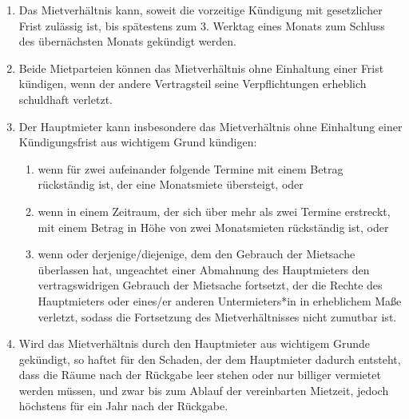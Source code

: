 \documentclass{scrreprt}[12pt,a4paper,twoside,duplex]
\begin{document}
\begin{contract}
\begin{enumerate}
	\item Das Mietverhältnis kann, soweit die vorzeitige Kündigung mit gesetzlicher Frist zulässig ist, bis spätestens zum 3. Werktag eines Monats zum Schluss des ü\-ber\-nä\-chst\-en Monats gekündigt werden.
	
	\item Beide Mietparteien können das Mietverhältnis ohne Einhaltung einer Frist kündigen, wenn der andere Vertragsteil seine Verpflichtungen erheblich schuldhaft verletzt.
	
	\item Der Hauptmieter kann insbesondere das Mietverhältnis ohne Einhaltung einer Kün\-di\-gungs\-frist aus wichtigem Grund kündigen:
	\begin{enumerate}
		\item wenn  für zwei aufeinander folgende Termine mit einem Betrag rückständig ist, der eine Monatsmiete übersteigt, oder
		
		\item wenn  in einem Zeitraum, der sich über mehr als zwei Termine erstreckt, mit einem Betrag in Höhe von zwei Monatsmieten rückständig ist, oder
		
		\item wenn  oder derjenige/diejenige, dem  den Gebrauch der Mietsache überlassen hat, ungeachtet einer Abmahnung des Hauptmieters den vertragswidrigen Gebrauch der Mietsache fortsetzt, der die Rechte des Hauptmieters oder eines/er anderen Untermieters*in in erheblichem Ma{\ss}e verletzt, sodass die Fortsetzung des Mietverhältnisses nicht zumutbar ist.
	\end{enumerate}

	\item Wird das Mietverhältnis durch den Hauptmieter aus wichtigem Grunde gekündigt, so
	haftet  für den Schaden, der dem Hauptmieter dadurch entsteht, dass die
	Räume nach der Rückgabe leer stehen oder nur billiger vermietet werden müssen,
	und zwar bis zum Ablauf der vereinbarten Mietzeit, jedoch höchstens für ein Jahr
	nach der Rückgabe.
\end{enumerate}
\end{contract}
\end{document}
